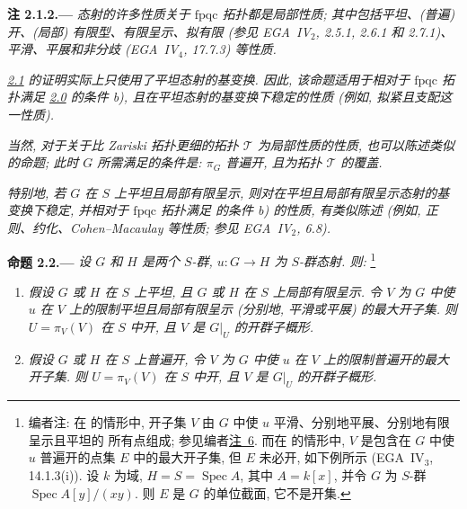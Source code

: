 \medskip
{}\label{rem:sga3-VIB-2.1.2}%
\noindent\textbf{注 2.1.2.---}
\emph{态射的许多性质关于 \(\mathrm{fpqc}\) 拓扑都是局部性质;
其中包括平坦、(普遍) 开、(局部) 有限型、有限呈示、拟有限
(参见 EGA~IV\(_2\), 2.5.1, 2.6.1 和 2.7.1)、
平滑、平展和非分歧 (EGA~IV\(_4\), 17.7.3) 等性质.
}

\emph{\hyperref[prop:sga3-VIB-2.1]{2.1} 的证明实际上只使用了平坦态射的基变换.
因此, 该命题适用于相对于 \(\mathrm{fpqc}\) 拓扑满足
\hyperref[par:sga3-VIB-2.0]{2.0} 的条件 \textup{b)},
且在平坦态射的基变换下稳定的性质
(例如, 拟紧且支配这一性质).
}

\emph{当然, 对于关于比 Zariski 拓扑更细的拓扑 \(\mathcal T\)
为局部性质的性质, 也可以陈述类似的命题;
此时 \(G\) 所需满足的条件是: \(\pi_G\) 普遍开,
且为拓扑 \(\mathcal T\) 的覆盖.
}

\emph{特别地, 若 \(G\) 在 \(S\) 上平坦且局部有限呈示,
则对在平坦且局部有限呈示态射的基变换下稳定,
并相对于 \(\mathrm{fpqc}\) 拓扑满足
 的条件 \textup{b)} 的性质,
有类似陈述 (例如, 正则、约化、Cohen--Macaulay 等性质;
参见 EGA~IV\(_2\), 6.8).}

\medskip
{}\label{prop:sga3-VIB-2.2}%
\noindent\textbf{命题 2.2.---}
\emph{设 \(G\) 和 \(H\) 是两个 \(S\)-群,
\(u:G\to H\) 为 \(S\)-群态射. 则:}%
\footnote{\label{note:sga3-VIB-19}编者注: 在
\textup{} 的情形中,
开子集 \(V\) 由 \(G\) 中使 \(u\) 平滑、分别地平展、分别地有限呈示且平坦的
所有点组成; 参见编者\hyperref[note:sga3-VIB-6]{注~6}.
而在 \textup{} 的情形中,
\(V\) 是包含在 \(G\) 中使 \(u\) 普遍开的点集 \(E\) 中的最大开子集,
但 \(E\) 未必开, 如下例所示 (EGA~IV\(_3\), 14.1.3(i)).
设 \(k\) 为域, \(H=S=\operatorname{Spec}A\), 其中 \(A=k[x]\),
并令 \(G\) 为 \(S\)-群 \(\operatorname{Spec}A[y]/(xy)\).
则 \(E\) 是 \(G\) 的单位截面, 它不是开集.}
\begin{enumerate}
\item[\textup{\SGAInlineRefTarget{prop:sga3-VIB-2.2:item:i}(i)}]
  \emph{假设 \(G\) 或 \(H\) 在 \(S\) 上平坦,
  且 \(G\) 或 \(H\) 在 \(S\) 上局部有限呈示.
  令 \(V\) 为 \(G\) 中使 \(u\) 在 \(V\) 上的限制平坦且局部有限呈示
  (分别地, 平滑或平展) 的最大开子集.
  则 \(U=\pi_V(V)\) 在 \(S\) 中开,
  且 \(V\) 是 \(G|_U\) 的开群子概形.}
\item[\textup{\SGAInlineRefTarget{prop:sga3-VIB-2.2:item:ii}(ii)}]
  \emph{假设 \(G\) 或 \(H\) 在 \(S\) 上普遍开,
  令 \(V\) 为 \(G\) 中使 \(u\) 在 \(V\) 上的限制普遍开的最大开子集.
  则 \(U=\pi_V(V)\) 在 \(S\) 中开,
  且 \(V\) 是 \(G|_U\) 的开群子概形.}
\end{enumerate}

